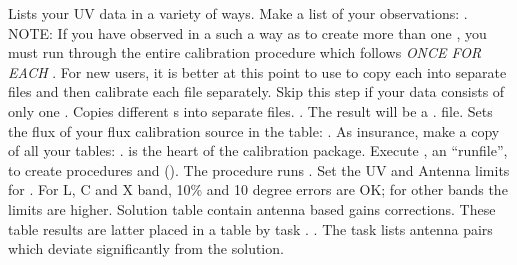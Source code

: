  Lists your UV data in a variety of ways.  Make a list
of your observations:
. NOTE: If you have observed in a such a way as to create more than one
, you must run through the entire calibration procedure which
follows {\it ONCE FOR EACH} . For new users, it is better at this
point to use  to copy each  into separate files
and then calibrate each file separately.
 Skip this step if your data consists of only one
. Copies different s into separate files.
. The
result will be a . file.
 Sets the flux of your flux calibration source in the \SU
table:
.
 As insurance, make a copy of all your tables:
.
  is the heart of the \AIPS
calibration package.
Execute , an \AIPS ``runfile'', to create
procedures  and  (). The procedure  runs .
Set the UV and Antenna limits for .
For L, C and X band, 10\% and 10 degree errors are OK;
for other bands the limits are higher.
\tablestyle
\beddes
{} Solution table contain antenna based gains corrections.
These \SN table results are latter placed in a \CL table by task
.
\eeddes
\normalstyle
{}.
The task  lists antenna pairs which deviate
significantly from the solution.


